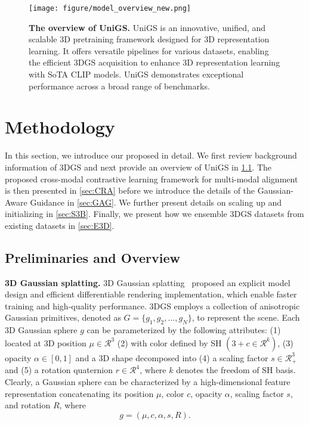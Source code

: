 \begin{figure*}%
    \centerline{\texttt{[image: figure/model\_overview\_new.png]}}
    \caption{\textbf{The overview of UniGS.} UniGS is an innovative, unified, and scalable 3D pretraining framework designed for 3D representation learning. It offers versatile pipelines for various datasets, enabling the efficient 3DGS acquisition to enhance 3D representation learning with SoTA CLIP models. UniGS demonstrates exceptional performance across a broad range of benchmarks.}
    \vspace{-3mm}
    \label{fig:framework_overview}
\end{figure*}

\vspace{-3mm}
\section{Methodology}
\label{sec:methodology}
\vspace{-3mm}
In this section, we introduce our proposed \name{} in detail. We first review background information of 3DGS and next provide an overview of UniGS in \cref{sec:preliminaries}. 
The proposed cross-modal contrastive learning framework for multi-modal alignment is then presented in \cref{sec:CRA} before we introduce the details of the Gaussian-Aware Guidance in \cref{sec:GAG}. We further present details on scaling up and initializing \name{} in \cref{sec:S3B}. Finally, we present how we ensemble 3DGS datasets from existing datasets in \cref{sec:E3D}.




\subsection{Preliminaries and Overview}
\label{sec:preliminaries}
\noindent\textbf{3D Gaussian splatting.}
3D Gaussian splatting~\citep{kerbl20233d} proposed an explicit model design and efficient differentiable rendering implementation, which enable faster training and high-quality performance. 3DGS employs a collection of anisotropic Gaussian primitives, denoted as \( G = \{g_1, g_2, \ldots, g_N\} \), to represent the scene. Each 3D Gaussian sphere $g$ can be parameterized by the following attributes: (1) located at 3D position $\mu\in\mathcal{R}^{3}$ (2) with color defined by SH $(3+c\in\mathcal{R}^{k})$, (3) opacity $\alpha\in[0,1]$ and a 3D shape decomposed into (4) a scaling factor $s\in\mathcal{R}^{3}_{+}$ and (5) a rotation quaternion $r\in\mathcal{R}^{4}$, where $k$ denotes the freedom of SH basis. Clearly, a Gaussian sphere can be characterized by a high-dimensional feature representation concatenating its position $\mu$, color $c$, opacity $\alpha$, scaling factor $s$, and rotation $R$, where
\begin{equation}
    g = (\mu,c,\alpha,s,R).
\end{equation}

